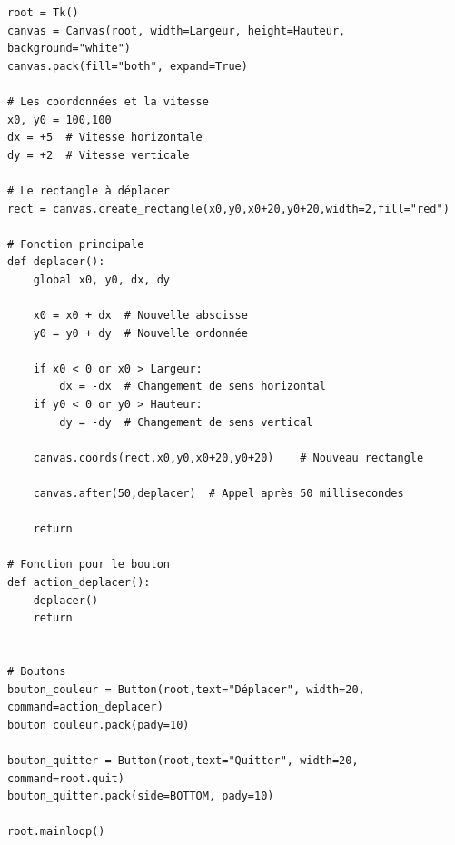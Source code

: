 \documentclass[11pt,class=report,crop=false]{standalone}
\begin{document}
\begin{cours}
\begin{lstlisting}
root = Tk()     
canvas = Canvas(root, width=Largeur, height=Hauteur, background="white")
canvas.pack(fill="both", expand=True)

# Les coordonnées et la vitesse
x0, y0 = 100,100
dx = +5  # Vitesse horizontale
dy = +2  # Vitesse verticale

# Le rectangle à déplacer
rect = canvas.create_rectangle(x0,y0,x0+20,y0+20,width=2,fill="red")

# Fonction principale
def deplacer():
    global x0, y0, dx, dy

    x0 = x0 + dx  # Nouvelle abscisse
    y0 = y0 + dy  # Nouvelle ordonnée

    if x0 < 0 or x0 > Largeur:
        dx = -dx  # Changement de sens horizontal
    if y0 < 0 or y0 > Hauteur:
        dy = -dy  # Changement de sens vertical

    canvas.coords(rect,x0,y0,x0+20,y0+20)    # Nouveau rectangle

    canvas.after(50,deplacer)  # Appel après 50 millisecondes
 
    return
    
# Fonction pour le bouton
def action_deplacer():
    deplacer()
    return


# Boutons
bouton_couleur = Button(root,text="Déplacer", width=20, command=action_deplacer)
bouton_couleur.pack(pady=10)

bouton_quitter = Button(root,text="Quitter", width=20, command=root.quit)
bouton_quitter.pack(side=BOTTOM, pady=10)

root.mainloop()
\end{lstlisting}

\end{cours}
\end{document}
